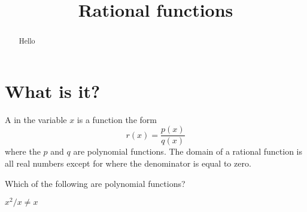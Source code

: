 \documentclass{ximera}
\title[Dig-In:]{Rational functions}
\begin{document}
\begin{abstract}
  Hello
\end{abstract}
\maketitle




\section{What is it?}

\begin{definition}
  A  in the variable $x$ is a function the form
  \[
  r(x) = \frac{p(x)}{q(x)}
  \]
  where the $p$ and $q$ are polynomial functions. The domain of a
  rational function is all real numbers except for where the
  denominator is equal to zero.
\end{definition}

\begin{question}
  Which of the following are polynomial functions?
  \begin{multipleChoice}
  \end{multipleChoice}
\end{question}




$x^2/x \ne x$
\end{document}
